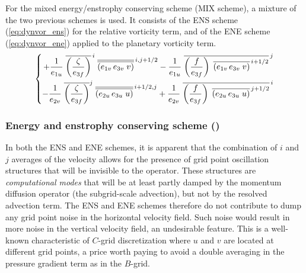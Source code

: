 \documentclass[../main/NEMO_manual]{subfiles}
\begin{document}
For the mixed energy/enstrophy conserving scheme (MIX scheme), a mixture of the two previous schemes is used.
It consists of the ENS scheme (\autoref{eq:dynvor_ens}) for the relative vorticity term,
and of the ENE scheme (\autoref{eq:dynvor_ene}) applied to the planetary vorticity term.
\[
  \left\{ {
      \begin{aligned}
        {+\frac{1}{e_{1u} }\; {\overline {\left( {\frac{\zeta }{e_{3f} }} \right)} }^{\,i}
          \; {\overline{\overline {\left( {e_{1v}\,e_{3v}\;v} \right)}} }^{\,i,j+1/2} -\frac{1}{e_{1u} }
          \; {\overline {\left( {\frac{f}{e_{3f} }} \right)
              \;\overline {\left( {e_{1v}\,e_{3v}\;v} \right)} ^{\,i+1/2}} }^{\,j} } \\
        {-\frac{1}{e_{2v} }\; {\overline {\left( {\frac{\zeta }{e_{3f} }} \right)} }^j
          \; {\overline{\overline {\left( {e_{2u}\,e_{3u}\;u} \right)}} }^{\,i+1/2,j} +\frac{1}{e_{2v} }
          \; {\overline {\left( {\frac{f}{e_{3f} }} \right)
              \;\overline {\left( {e_{2u}\,e_{3u}\;u} \right)} ^{\,j+1/2}} }^{\,i} } \hfill
      \end{aligned}
    } \right.
\]

\subsubsection{Energy and enstrophy conserving scheme (\protect{}) }
\label{subsec:DYN_vor_een}

In both the ENS and ENE schemes,
it is apparent that the combination of $i$ and $j$ averages of the velocity allows for
the presence of grid point oscillation structures that will be invisible to the operator.
These structures are \textit{computational modes} that will be at least partly damped by
the momentum diffusion operator (\ie the subgrid-scale advection), but not by the resolved advection term.
The ENS and ENE schemes therefore do not contribute to dump any grid point noise in the horizontal velocity field.
Such noise would result in more noise in the vertical velocity field, an undesirable feature.
This is a well-known characteristic of $C$-grid discretization where
$u$ and $v$ are located at different grid points,
a price worth paying to avoid a double averaging in the pressure gradient term as in the $B$-grid.
\end{document}
